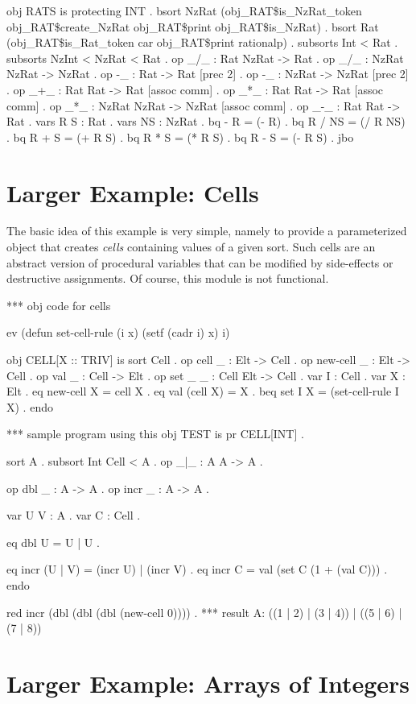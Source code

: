 obj RATS is
  protecting INT .
  bsort NzRat (obj_RAT\$is_NzRat_token obj_RAT\$create_NzRat
               obj_RAT\$print obj_RAT\$is_NzRat) .
  bsort Rat (obj_RAT\$is_Rat_token car obj_RAT\$print rationalp) .
  subsorts Int < Rat .
  subsorts NzInt < NzRat < Rat .
  op _/_ : Rat NzRat -> Rat .
  op _/_ : NzRat NzRat -> NzRat .
  op -_  : Rat -> Rat [prec 2] .
  op -_  : NzRat -> NzRat [prec 2] .
  op _+_ : Rat Rat -> Rat [assoc comm] .
  op _*_ : Rat Rat -> Rat [assoc comm] .
  op _*_ : NzRat NzRat -> NzRat [assoc comm] .
  op _-_ : Rat Rat -> Rat .
  vars R S : Rat .
  vars NS : NzRat .
  bq - R = (- R) .
  bq R / NS = (/ R NS) .
  bq R + S = (+ R S) .
  bq R * S = (* R S) .
  bq R - S = (- R S) .
jbo
\eobj

\section{Larger Example: Cells}

The basic idea of this example is very simple, namely to provide a
parameterized object that creates {\em cells} containing values of a
given sort.  Such cells are an abstract version of procedural
variables that can be modified by side-effects or destructive
assignments.  Of course, this module is not functional.

\bobj
*** obj code for cells

ev (defun set-cell-rule (i x) (setf (cadr i) x) i)

obj CELL[X :: TRIV] is
  sort Cell .
  op cell _ : Elt -> Cell .
  op new-cell _ : Elt -> Cell .
  op val _ : Cell -> Elt .
  op set _ _ : Cell Elt -> Cell .
  var I : Cell .
  var X : Elt .
  eq new-cell X = cell X .
  eq val (cell  X) = X .
  beq set I X = (set-cell-rule I X) .
endo

*** sample program using this
obj TEST is
  pr CELL[INT] .

  sort A .
  subsort Int Cell < A .
  op _|_ : A A -> A .

  op dbl _ : A -> A .
  op incr _ : A -> A .

  var U V : A .
  var C : Cell .

  eq dbl U = U | U .

  eq incr (U | V) = (incr U) | (incr V) .
  eq incr C = val (set C (1 + (val C))) .
endo

red incr (dbl (dbl (dbl (new-cell 0)))) .
*** result A: ((1 | 2) | (3 | 4)) | ((5 | 6) | (7 | 8))
\eobj

\section {Larger Example: Arrays of Integers}

